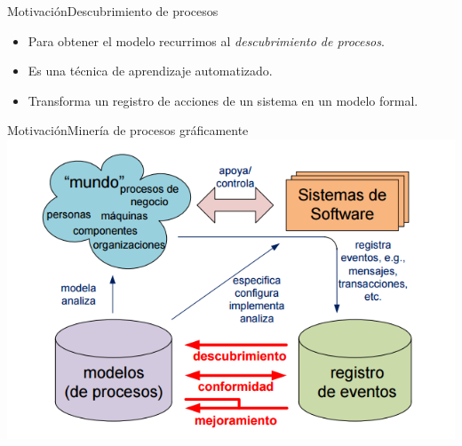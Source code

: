 \documentclass[spanish,pdf]{beamer}
\begin{document}
\begin{frame}{Motivación}{Descubrimiento de procesos}
    \begin{itemize}
      \setlength\itemsep{0.4cm}
      \item<2-> Para obtener el modelo recurrimos al \textit{descubrimiento de procesos}.
      \item<3-> Es una técnica de aprendizaje automatizado.
      \item<4-> Transforma un registro de acciones de un sistema en un modelo formal.
    \end{itemize}
    \vspace*{0.5cm}
    \pause[5]
                
\end{frame}

\begin{frame}{Motivación}{Minería de procesos gráficamente}
  \centering
  \includegraphics[width=0.95\linewidth]{img/pmcycle.png}
\end{frame}
\end{document}
